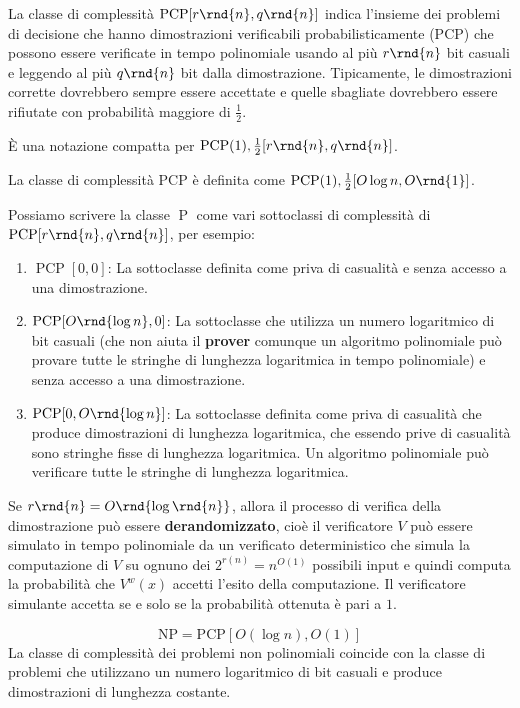 \documentclass[\main/main.tex]{subfiles}
\begin{document}
\begin{definition}
    La classe di complessità \(\operatorname{PCP}[r\rnd{n}, q\rnd{n}]\) indica l'insieme dei problemi di decisione che hanno dimostrazioni verificabili probabilisticamente (PCP) che possono essere verificate in tempo polinomiale usando al più \(r\rnd{n}\) bit casuali e leggendo al più \(q\rnd{n}\) bit dalla dimostrazione. Tipicamente, le dimostrazioni corrette dovrebbero sempre essere accettate e quelle sbagliate dovrebbero essere rifiutate con probabilità maggiore di \(\frac{1}{2}\).
    
    È una notazione compatta per \(\operatorname{PCP}(1), \frac{1}{2}[r\rnd{n}, q\rnd{n}]\).
\end{definition}
\begin{definition}
    La classe di complessità PCP è definita come \(\operatorname{PCP}(1), \frac{1}{2}[O\log{n}, O\rnd{1}]\).
\end{definition}
\begin{observation}
    Possiamo scrivere la classe \(\operatorname{P}\) come vari sottoclassi di complessità di \(\operatorname{PCP}[r\rnd{n}, q\rnd{n}]\), per esempio:
    \begin{enumerate}
        \item \(\operatorname{PCP}[0, 0]\): La sottoclasse definita come priva di casualità e senza accesso a una dimostrazione.
        \item \(\operatorname{PCP}[O\rnd{\log{n}}, 0]\): La sottoclasse che utilizza un numero logaritmico di bit casuali (che non aiuta il \textbf{prover} comunque un algoritmo polinomiale può provare tutte le stringhe di lunghezza logaritmica in tempo polinomiale) e senza accesso a una dimostrazione.
        \item \(\operatorname{PCP}[0, O\rnd{\log{n}}]\): La sottoclasse definita come priva di casualità che produce dimostrazioni di lunghezza logaritmica, che essendo prive di casualità sono stringhe fisse di lunghezza logaritmica. Un algoritmo polinomiale può verificare tutte le stringhe di lunghezza logaritmica.
    \end{enumerate}
\end{observation}
\begin{definition}[Derandomizzazione]
    Se \(r\rnd{n} = O\rnd{\log\rnd{n}}\), allora il processo di verifica della dimostrazione può essere \textbf{derandomizzato}, cioè il verificatore \(V\) può essere simulato in tempo polinomiale da un verificato deterministico che simula la computazione di \(V\) su ognuno dei \(2^{r(n)}=n^{O(1)}\) possibili input e quindi computa la probabilità che \(V^{w}(x)\) accetti l'esito della computazione. Il verificatore simulante accetta se e solo se la probabilità ottenuta è pari a \(1\).
\end{definition}
\begin{theorem}
    \[
        \mathrm{NP}=\mathrm{PCP}[O(\log n), O(1)]
    \]
    La classe di complessità dei problemi non polinomiali coincide con la classe di problemi che utilizzano un numero logaritmico di bit casuali e produce dimostrazioni di lunghezza costante.
\end{theorem}
\end{document}
